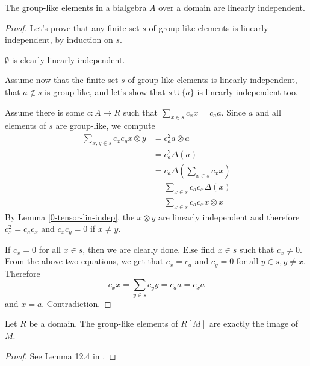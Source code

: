 \begin{lemma}
  \label{0-grp-like-lin-indep}
  \leanok

  The group-like elements in a bialgebra $A$ over a domain are linearly independent.
\end{lemma}
\begin{proof}
  \leanok

  Let's prove that any finite set $s$ of group-like elements is linearly independent, by induction on $s$.

  $\emptyset$ is clearly linearly independent.

  Assume now that the finite set $s$ of group-like elements is linearly independent, that $a \notin s$ is group-like, and let's show that $s \cup \{a\}$ is linearly independent too.

  Assume there is some $c : A \to R$ such that $\sum_{x \in s} c_x x = c_a a$.
  Since $a$ and all elements of $s$ are group-like, we compute
  \begin{align*}
    \sum_{x, y \in s} c_x c_y x \otimes y
    & = c_a ^ 2 a \otimes a \\
    & = c_a ^ 2 \Delta(a) \\
    & = c_a \Delta\left(\sum_{x \in s} c_x x\right) \\
    & = \sum_{x \in s} c_a c_x \Delta(x) \\
    & = \sum_{x \in s} c_a c_x x \otimes x
  \end{align*}
  By Lemma \ref{0-tensor-lin-indep}, the $x \otimes y$ are linearly independent and therefore $c_x ^ 2 = c_a c_x$ and $c_x c_y = 0$ if $x \ne y$.

  If $c_x = 0$ for all $x \in s$, then we are clearly done.
  Else find $x \in s$ such that $c_x \ne 0$.
  From the above two equations, we get that $c_x = c_a$ and $c_y = 0$ for all $y \in s, y \ne x$.
  Therefore
  \[c_x x = \sum_{y \in s} c_y y = c_a a = c_x a\]
  and $x = a$.
  Contradiction.
\end{proof}


\begin{lemma}
  \label{0-grp-like-grp-alg}
  \leanok

  Let $R$ be a domain.
  The group-like elements of $R[M]$ are exactly the image of $M$.
\end{lemma}
\begin{proof}
  \leanok

  See Lemma 12.4 in \cite{Milne_2017}.
\end{proof}


